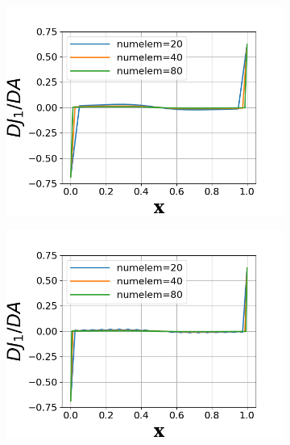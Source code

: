 \documentclass[a4paper]{article}
\begin{document}
\begin{figure}[!htbp]
  \centering
  \begin{subfigure}{0.45\textwidth}
    \centering
    \includegraphics[width=1.0\linewidth]{figures/DJ1DA_p1.png}
    \label{fig:Dj1_p1}
  \end{subfigure}
  \begin{subfigure}{0.45\textwidth}
    \centering
    \includegraphics[width=1.0\linewidth]{figures/DJ1DA_p2.png}
    \label{fig:Dj1_p2}
  \end{subfigure}
  \begin{subfigure}{0.45\textwidth}
    \centering

\end{subfigure}
\end{figure}
\end{document}

